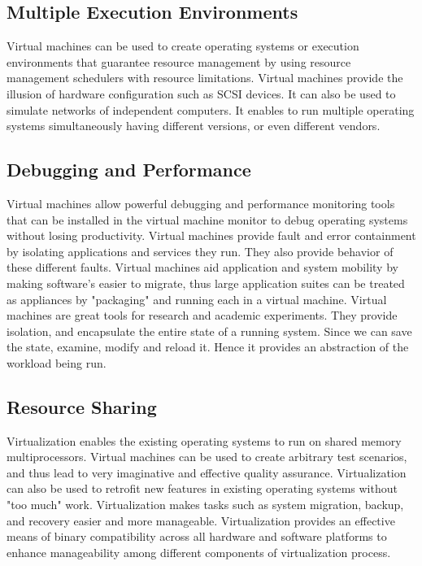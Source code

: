 \documentclass[12pt,a4paper]{report}
\begin{document}
\subsection{Multiple Execution Environments}
 Virtual machines can be used to create operating systems or execution environments that guarantee resource management by using resource management schedulers with resource limitations. Virtual machines provide the illusion of hardware configuration such as SCSI devices. It can also be used to simulate networks of independent computers. It enables to run multiple operating systems simultaneously having different versions, or even different vendors.

\subsection{Debugging and Performance}
 Virtual machines allow powerful debugging and performance monitoring tools that can be installed in the virtual machine monitor to debug operating systems without losing productivity. Virtual machines provide fault and error containment by isolating applications and services they run. They also provide behavior of these different faults. Virtual machines aid application and system mobility by making software’s easier to migrate, thus large application suites can be treated as appliances by "packaging" and running each in a virtual machine. Virtual machines are great tools for research and academic experiments. They provide isolation, and encapsulate the entire state of a running system. Since we can save the state, examine, modify and reload it. Hence it provides an abstraction of the workload being run. 

\subsection{Resource Sharing} 
Virtualization enables the existing operating systems to run on shared memory multiprocessors. Virtual machines can be used to create arbitrary test scenarios, and thus lead to very imaginative and effective quality assurance. Virtualization can also be used to retrofit new features in existing operating systems without "too much" work. Virtualization makes tasks such as system migration, backup, and recovery easier and more manageable. Virtualization provides an effective means of binary compatibility across all hardware and software platforms to enhance manageability among different components of virtualization process.
\end{document}
